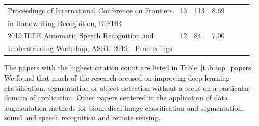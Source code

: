 \documentclass[parskip=full]{scrartcl}
\begin{document}
\begin{table}[ht]
\begin{center}
\begin{tabular*}{\textwidth}{@{\extracolsep{\fill}}lllllll@{\extracolsep{\fill}}}
        Proceedings of International Conference on Frontiers & 13 & 113 & 8.69 \\
        \vspace{.2cm}in Handwriting Recognition, ICFHR &&& \\

        2019 IEEE Automatic Speech Recognition and & 12 & 84 & 7.00 \\
        Understanding Workshop, ASRU 2019 - Proceedings &&& \\
        \bottomrule
    \end{tabular*}
    \end{center}
\end{table}

The papers with the highest citation count are listed in
Table~\ref{tab:top_papers}. We found that much of the research focused on
improving deep learning classification, segmentation or object detection
without a focus on a particular domain of application. Other papers centered
in the application of data augmentation methods for biomedical image
classification and segmentation, sound and speech recognition and remote
sensing.
\end{document}
